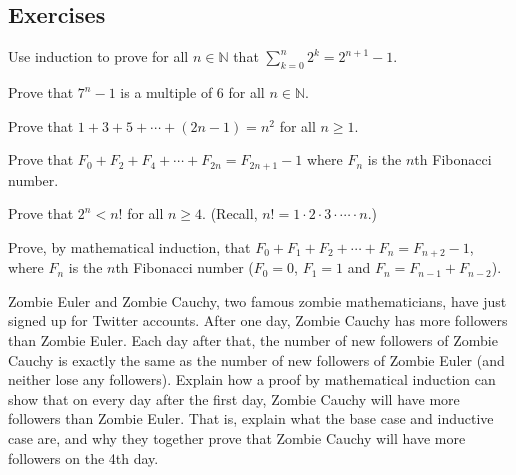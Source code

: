 \documentclass[10pt,]{book}
\theoremstyle{plain}
\theoremstyle{definition}
\theoremstyle{definition}
\theoremstyle{definition}
\theoremstyle{definition}
\numberwithin{equation}{chapter}
\def\d{\displaystyle}
\def\N{\mathbb N}
\newcommand{\lt}{<}
\begin{document}
\subsection*{Exercises}\label{exercises_seq-induction}
\begin{divisionexercise}{1}\hypertarget{exercise-256}{}
\hypertarget{p-2256}{}%
Use induction to prove for all \(n \in \N\) that \(\d\sum_{k=0}^n 2^k = 2^{n+1} - 1\).%
\end{divisionexercise}%
\begin{divisionexercise}{2}\hypertarget{exercise-257}{}
\hypertarget{p-2259}{}%
Prove that \(7^n - 1\) is a multiple of 6 for all \(n \in \N\).%
\end{divisionexercise}%
\begin{divisionexercise}{3}\hypertarget{exercise-258}{}
\hypertarget{p-2262}{}%
Prove that \(1 + 3 + 5 + \cdots + (2n-1) = n^2\) for all \(n \ge 1\).%
\end{divisionexercise}%
\begin{divisionexercise}{4}\hypertarget{exercise-259}{}
\hypertarget{p-2265}{}%
Prove that \(F_0 + F_2 + F_4 + \cdots + F_{2n} = F_{2n+1} - 1\) where \(F_n\) is the \(n\)th Fibonacci number.%
\end{divisionexercise}%
\begin{divisionexercise}{5}\hypertarget{exercise-260}{}
\hypertarget{p-2268}{}%
Prove that \(2^n \lt  n!\) for all \(n \ge 4\). (Recall, \(n! = 1\cdot 2 \cdot 3 \cdot \cdots\cdot n\).)%
\end{divisionexercise}%
\begin{divisionexercise}{6}\hypertarget{exercise-261}{}
\hypertarget{p-2271}{}%
Prove, by mathematical induction, that \(F_0 + F_1 + F_2 + \cdots + F_{n} = F_{n+2} - 1\), where \(F_n\) is the \(n\)th Fibonacci number (\(F_0 = 0\), \(F_1 = 1\) and \(F_n = F_{n-1} + F_{n-2}\)).%
\end{divisionexercise}%
\begin{divisionexercise}{7}\hypertarget{exercise-262}{}
\hypertarget{p-2279}{}%
Zombie Euler and Zombie Cauchy, two famous zombie mathematicians, have just signed up for Twitter accounts. After one day, Zombie Cauchy has more followers than Zombie Euler. Each day after that, the number of new followers of Zombie Cauchy is exactly the same as the number of new followers of Zombie Euler (and neither lose any followers). Explain how a proof by mathematical induction can show that on every day after the first day, Zombie Cauchy will have more followers than Zombie Euler. That is, explain what the base case and inductive case are, and why they together prove that Zombie Cauchy will have more followers on the 4th day.%
\end{divisionexercise}%
\end{document}
